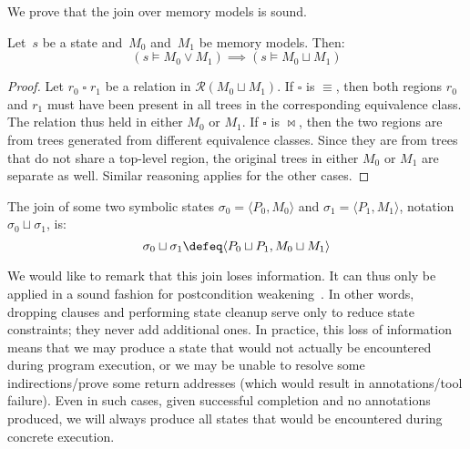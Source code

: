 We prove that the join over memory models is sound.
\begin{lemma}\label{lem:mem_soundness}
  Let~$s$ be a state and~$M_0$ and~$M_1$ be memory models. Then:
  \begin{equation*}
    (s\models M_0 \vee M_1) \implies (s\models M_0\sqcup M_1)
  \end{equation*}
\end{lemma}
\begin{proof}
  Let $r_0\mathbin{\square}r_1$ be a relation in $\mathcal{R}(M_0 \sqcup M_1)$.
  If $\square$ is $\equiv$, then both regions $r_0$ and $r_1$ must have been present in all trees in the corresponding equivalence class.
  The relation thus held in either $M_0$ or $M_1$.
  If $\square$ is $\bowtie$, then the two regions are from trees generated from different equivalence classes. Since they are from trees that do not share a top-level region, the original trees in either $M_0$ or $M_1$ are separate as well.
  Similar reasoning applies for the other cases.
\end{proof}


\begin{definition}
  The join of some two symbolic states $\sigma_0=\langle P_0,M_0\rangle$
  and $\sigma_1=\langle P_1,M_1\rangle$, notation $\sigma_0 \sqcup \sigma_1$, is:
  \begin{equation*}
    \sigma_0 \sqcup \sigma_1 \defeq \langle P_0\sqcup P_1,M_0\sqcup M_1\rangle
  \end{equation*}
\end{definition}

We would like to remark that this join loses information.
It can thus only be applied in a sound fashion for postcondition weakening~\cite{hoare1969axiomatic}.
In other words, dropping clauses and performing state cleanup
serve only to reduce state constraints; they never add additional ones.
In practice, this loss of information means that we may produce a state
that would not actually be encountered during program execution,
or we may be unable to resolve some indirections/prove some return addresses
(which would result in annotations/tool failure).
Even in such cases, given successful completion and no annotations produced,
we will always produce all states that would be encountered during concrete execution.
